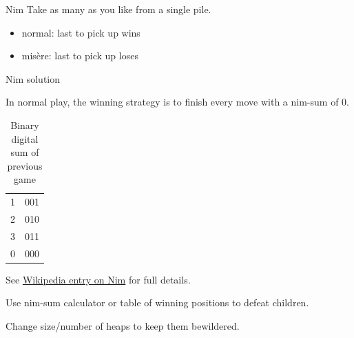 \documentclass[compress]{beamer}
\newcommand{\blue}[1]{\textcolor{NordBlue}{#1}}
\newcommand{\red}[1]{\textcolor{NordRed}{#1}}
\newcommand{\yellow}[1]{\textcolor{NordYellow}{#1}}
\newcommand{\cyan}[1]{\textcolor{NordCyan}{#1}}
\newcommand{\bcyan}[1]{\textcolor{NordBrightCyan}{#1}}
\begin{document}
\begin{frame}[fragile]{Nim}
Take as many as you like from a single pile.
\smallskip
\begin{center}
{\Huge
\blue{ }

\smallskip
\red{  \symbol{"26C2}}

\smallskip
\blue{  \symbol{"26C0} \symbol{"26C0}}

}

\end{center}

\medskip
\begin{itemize}
    \item \bcyan{normal}: last to pick up wins
    \item \bcyan{mis\`ere}: last to pick up loses
\end{itemize}

\end{frame}

\begin{frame}{Nim solution}

In normal play, the winning strategy is to finish every move with a \cyan{nim-sum} of 0.

\bigskip

\begin{table}
\centering
\begin{tabular}{c | c}
    1 & 001 \\
    2 & 010 \\
    3 & 011 \\
\hline
    0 & 000
\end{tabular}

\caption{Binary digital sum of previous game}

\end{table}
\medskip
See \href{https://en.wikipedia.org/wiki/Nim}{\yellow{Wikipedia entry on Nim}} for full details.

Use nim-sum calculator or table of winning positions to defeat children.

Change size/number of heaps to keep them bewildered.

\end{frame}
\end{document}
